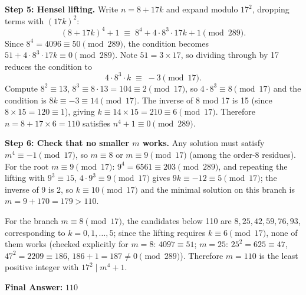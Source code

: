 \begin{ReasoningBox}[title={Case Study: Math Reasoning (Pre-RL / Post-RL Setting)}, breakable]
\textbf{Step 5: Hensel lifting.} Write $n = 8 + 17k$ and expand modulo $17^2$, dropping terms with $(17k)^2$:
\[
(8+17k)^4 + 1 \;\equiv\; 8^4 + 4 \cdot 8^3 \cdot 17k + 1 \pmod{289}.
\]
Since $8^4 = 4096 \equiv 50 \pmod{289}$, the condition becomes $51 + 4 \cdot 8^3 \cdot 17 k \equiv 0 \pmod{289}$. Note $51 = 3 \times 17$, so dividing through by 17 reduces the condition to
\[
4 \cdot 8^3 \cdot k \;\equiv\; -3 \pmod{17}.
\]
Compute $8^2 \equiv 13$, $8^3 \equiv 8 \cdot 13 = 104 \equiv 2 \pmod{17}$, so $4 \cdot 8^3 \equiv 8 \pmod{17}$ and the condition is $8k \equiv -3 \equiv 14 \pmod{17}$. The inverse of 8 mod 17 is 15 (since $8 \times 15 = 120 \equiv 1$), giving $k \equiv 14 \times 15 = 210 \equiv 6 \pmod{17}$. Therefore $n = 8 + 17 \times 6 = 110$ satisfies $n^4 + 1 \equiv 0 \pmod{289}$.

\textbf{Step 6: Check that no smaller $m$ works.} Any solution must satisfy $m^4 \equiv -1 \pmod{17}$, so $m \equiv 8$ or $m \equiv 9 \pmod{17}$ (among the order-8 residues). For the root $m \equiv 9 \pmod{17}$: $9^4 = 6561 \equiv 203 \pmod{289}$, and repeating the lifting with $9^3 \equiv 15$, $4 \cdot 9^3 \equiv 9 \pmod{17}$ gives $9k \equiv -12 \equiv 5 \pmod{17}$; the inverse of 9 is 2, so $k \equiv 10 \pmod{17}$ and the minimal solution on this branch is $m = 9 + 170 = 179 > 110$.

For the branch $m \equiv 8 \pmod{17}$, the candidates below 110 are $8, 25, 42, 59, 76, 93$, corresponding to $k = 0, 1, \dots, 5$; since the lifting requires $k \equiv 6 \pmod{17}$, none of them works (checked explicitly for $m = 8$: $4097 \equiv 51$; $m = 25$: $25^2 = 625 \equiv 47$, $47^2 = 2209 \equiv 186$, $186 + 1 = 187 \neq 0 \pmod{289}$). Therefore $m = 110$ is the least positive integer with $17^2 \mid m^4+1$.

\textbf{Final Answer:} $\boxed{110}$
\end{ReasoningBox}
\label{fig:example_math}

\bigskip

